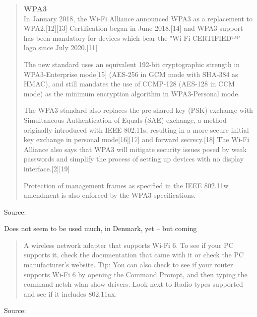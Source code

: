 \documentclass[Screen16to9,17pt]{foils}
\begin{document}


\begin{quote}\small
{\bf WPA3}\\
In January 2018, the Wi-Fi Alliance announced WPA3 as a replacement to WPA2.[12][13] Certification began in June 2018,[14] and WPA3 support has been mandatory for devices which bear the "Wi-Fi CERTIFIED™" logo since July 2020.[11]

The new standard uses an equivalent 192-bit cryptographic strength in WPA3-Enterprise mode[15] (AES-256 in GCM mode with SHA-384 as HMAC), and still mandates the use of CCMP-128 (AES-128 in CCM mode) as the minimum encryption algorithm in WPA3-Personal mode.

The WPA3 standard also replaces the pre-shared key (PSK) exchange with Simultaneous Authentication of Equals (SAE) exchange, a method originally introduced with IEEE 802.11s, resulting in a more secure initial key exchange in personal mode[16][17] and forward secrecy.[18] The Wi-Fi Alliance also says that WPA3 will mitigate security issues posed by weak passwords and simplify the process of setting up devices with no display interface.[2][19]

Protection of management frames as specified in the IEEE 802.11w amendment is also enforced by the WPA3 specifications.
\end{quote}
Source: 

\begin{list2}
\item Does not seem to be used much, in Denmark, yet -- but coming
\end{list2}



\begin{quote}
A wireless network adapter that supports Wi-Fi 6. To see if your PC supports it, check the documentation that came with it or check the PC manufacturer’s website.
Tip: You can also check to see if your router supports Wi-Fi 6 by opening the Command Prompt, and then typing the command netsh wlan show drivers. Look next to Radio types supported and see if it includes 802.11ax.
\end{quote}
Source: 
\end{document}
